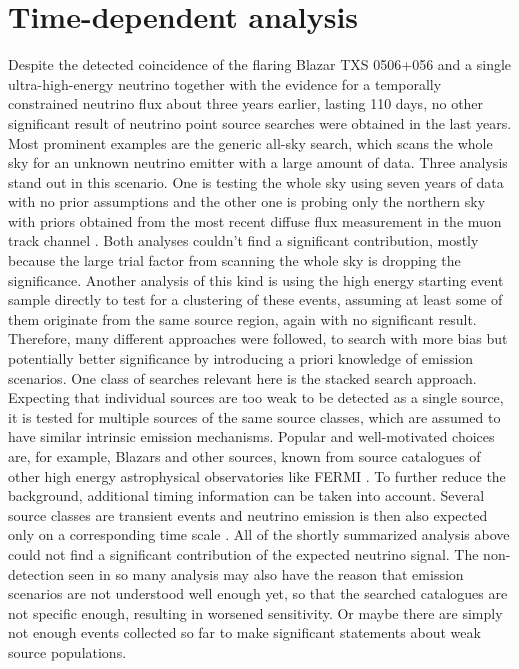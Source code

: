 \chapter{Time-dependent analysis}
  \label{chp:time_dep}
Despite the detected coincidence of the flaring Blazar TXS 0506+056 and a single ultra-high-energy neutrino together with the evidence for a temporally constrained neutrino flux about three years earlier, lasting 110 days, no other significant result of neutrino point source searches were obtained in the last years.
Most prominent examples are the generic all-sky search, which scans the whole sky for an unknown neutrino emitter with a large amount of data.
Three analysis stand out in this scenario.
One is testing the whole sky using seven years of data with no prior assumptions \cite{Aartsen:2016oji} and the other one is probing only the northern sky with priors obtained from the most recent diffuse flux measurement in the muon track channel \cite{Haack:2017dxi,Reimann:2017owh}.
Both analyses couldn't find a significant contribution, mostly because the large trial factor from scanning the whole sky is dropping the significance.
Another analysis of this kind is using the high energy starting event sample directly to test for a clustering of these events, assuming at least some of them originate from the same source region, again with no significant result.
Therefore, many different approaches were followed, to search with more bias but potentially better significance by introducing a priori knowledge of emission scenarios.
One class of searches relevant here is the stacked search approach.
Expecting that individual sources are too weak to be detected as a single source, it is tested for multiple sources of the same source classes, which are assumed to have similar intrinsic emission mechanisms.
Popular and well-motivated choices are, for example, Blazars and other sources, known from source catalogues of other high energy astrophysical observatories like FERMI \cite{Aartsen:2017zvw,Aartsen:2017wea,Aartsen:2016lir,Aartsen:2017ujz}.
To further reduce the background, additional timing information can be taken into account.
Several source classes are transient events and neutrino emission is then also expected only on a corresponding time scale \cite{Bianco:2007fe,Komossa:2015qya,Katz:2016dti}.
All of the shortly summarized analysis above could not find a significant contribution of the expected neutrino signal.
The non-detection seen in so many analysis may also have the reason that emission scenarios are not understood well enough yet, so that the searched catalogues are not specific enough, resulting in worsened sensitivity.
Or maybe there are simply not enough events collected so far to make significant statements about weak source populations.


